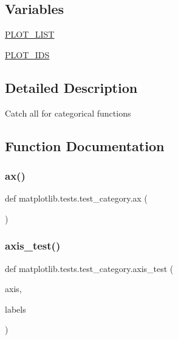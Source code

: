 \subsection*{Variables}
\begin{DoxyCompactItemize}
\item 
\hyperlink{namespacematplotlib_1_1tests_1_1test__category_a81abf8bd38286864cbe03dd0794cd054}{P\+L\+O\+T\+\_\+\+L\+I\+ST}
\item 
\hyperlink{namespacematplotlib_1_1tests_1_1test__category_a334e7699f5416f5d9300c75dd5301043}{P\+L\+O\+T\+\_\+\+I\+DS}
\end{DoxyCompactItemize}


\subsection{Detailed Description}
\begin{DoxyVerb}Catch all for categorical functions\end{DoxyVerb}
 

\subsection{Function Documentation}
\mbox{\label{namespacematplotlib_1_1tests_1_1test__category_ac4a78c2ee1d8720275b6d0ca5dee3c1c}} 
\subsubsection{\texorpdfstring{ax()}{ax()}}
{\footnotesize\ttfamily def matplotlib.\+tests.\+test\+\_\+category.\+ax (\begin{DoxyParamCaption}{ }\end{DoxyParamCaption})}

\mbox{\label{namespacematplotlib_1_1tests_1_1test__category_a0254453786522ce92c06264d0662bf9c}} 
\subsubsection{\texorpdfstring{axis\+\_\+test()}{axis\_test()}}
{\footnotesize\ttfamily def matplotlib.\+tests.\+test\+\_\+category.\+axis\+\_\+test (\begin{DoxyParamCaption}\item[{}]{axis,  }\item[{}]{labels }\end{DoxyParamCaption})}

